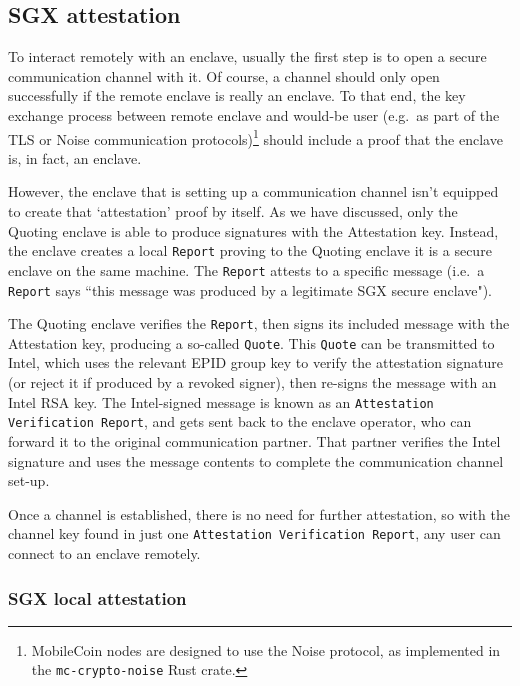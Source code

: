 \subsection{SGX attestation}
\label{subsec:enclaves-sgx-attestation}

To interact remotely with an enclave, usually the first step is to open a secure communication channel with it. Of course, a channel should only open successfully if the remote enclave is really an enclave. To that end, the key exchange process between remote enclave and would-be user (e.g.\ as part of the TLS \cite{tls-transport-layer-security-resource} or Noise \cite{noise-protocol-framework} communication protocols)\footnote{MobileCoin nodes are designed to use the Noise protocol, as implemented in the {\tt mc-crypto-noise} Rust crate.} should include a proof that the enclave is, in fact, an enclave.

However, the enclave that is setting up a communication channel isn't equipped to create that `attestation' proof by itself. As we have discussed, only the Quoting enclave is able to produce signatures with the Attestation key. Instead, the enclave creates a local {\tt Report} proving to the Quoting enclave it is a secure enclave on the same machine. The {\tt Report} attests to a specific message (i.e.\ a {\tt Report} says ``this message was produced by a legitimate SGX secure enclave").

The Quoting enclave verifies the {\tt Report}, then signs its included message with the Attestation key, producing a so-called {\tt Quote}. This {\tt Quote} can be transmitted to Intel, which uses the relevant EPID group key to verify the attestation signature (or reject it if produced by a revoked signer), then re-signs the message with an Intel RSA key. The Intel-signed message is known as an {\tt Attestation Verification Report}, and gets sent back to the enclave operator, who can forward it to the original communication partner. That partner verifies the Intel signature and uses the message contents to complete the communication channel set-up.

Once a channel is established, there is no need for further attestation, so with the channel key found in just one {\tt Attestation Verification Report}, any user can connect to an enclave remotely.

\subsubsection{SGX local attestation}

